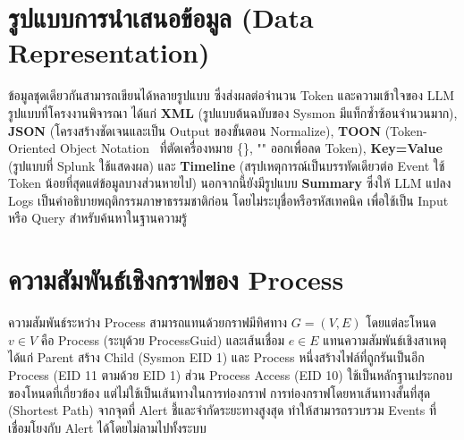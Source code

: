 \section{รูปแบบการนำเสนอข้อมูล (Data Representation)}
ข้อมูลชุดเดียวกันสามารถเขียนได้หลายรูปแบบ ซึ่งส่งผลต่อจำนวน Token และความเข้าใจของ LLM
รูปแบบที่โครงงานพิจารณา ได้แก่
\textbf{XML} (รูปแบบต้นฉบับของ Sysmon มีแท็กซ้ำซ้อนจำนวนมาก),
\textbf{JSON} (โครงสร้างชัดเจนและเป็น Output ของขั้นตอน Normalize),
\textbf{TOON} (Token-Oriented Object Notation~\cite{toon-format} ที่ตัดเครื่องหมาย \{\}, "" ออกเพื่อลด Token),
\textbf{Key=Value} (รูปแบบที่ Splunk ใช้แสดงผล) และ
\textbf{Timeline} (สรุปเหตุการณ์เป็นบรรทัดเดียวต่อ Event ใช้ Token น้อยที่สุดแต่ข้อมูลบางส่วนหายไป)
นอกจากนี้ยังมีรูปแบบ \textbf{Summary} ซึ่งให้ LLM แปลง Logs เป็นคำอธิบายพฤติกรรมภาษาธรรมชาติก่อน โดยไม่ระบุชื่อหรือรหัสเทคนิค เพื่อใช้เป็น Input หรือ Query สำหรับค้นหาในฐานความรู้


\section{ความสัมพันธ์เชิงกราฟของ Process}
ความสัมพันธ์ระหว่าง Process สามารถแทนด้วยกราฟมีทิศทาง $G=(V,E)$
โดยแต่ละโหนด $v \in V$ คือ Process (ระบุด้วย ProcessGuid)
และเส้นเชื่อม $e \in E$ แทนความสัมพันธ์เชิงสาเหตุ ได้แก่
Parent สร้าง Child (Sysmon EID 1) และ Process หนึ่งสร้างไฟล์ที่ถูกรันเป็นอีก Process (EID 11 ตามด้วย EID 1)
ส่วน Process Access (EID 10) ใช้เป็นหลักฐานประกอบของโหนดที่เกี่ยวข้อง แต่ไม่ใช้เป็นเส้นทางในการท่องกราฟ
การท่องกราฟโดยหาเส้นทางสั้นที่สุด (Shortest Path) จากจุดที่ Alert ชี้และจำกัดระยะทางสูงสุด
ทำให้สามารถรวบรวม Events ที่เชื่อมโยงกับ Alert ได้โดยไม่ลามไปทั้งระบบ

